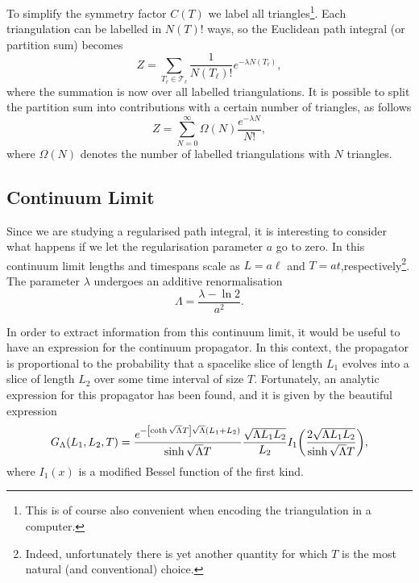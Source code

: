 To simplify the symmetry factor $C(T)$ we label all triangles\footnote{This is of course also convenient when encoding the triangulation in a computer.}. Each triangulation can be labelled in $N(T)!$ ways, so the Euclidean path integral (or partition sum) becomes
\begin{equation}
    Z
    =
    \sum_{T_\ell \in \mathcal{T}_\ell} \frac{1}{N(T_\ell)!} e^{- \lambda N(T_\ell)}
    ,
\end{equation}
where the summation is now over all labelled triangulations. It is possible to split the partition sum into contributions with a certain number of triangles, as follows
\begin{equation}\label{eq:part_sum}
    Z
    =
    \sum_{N = 0}^\infty \Omega(N) \frac{e^{- \lambda N}}{N!}
    ,
\end{equation}
where $\Omega(N)$ denotes the number of labelled triangulations with $N$ triangles.

\subsection{Continuum Limit}

Since we are studying a regularised path integral, it is interesting to consider what happens if we let the regularisation parameter $a$ go to zero. In this continuum limit lengths and timespans scale as $L = a \ell$ and $T = a t$,respectively\footnote{Indeed, unfortunately there is yet another quantity for which $T$ is the most natural (and conventional) choice.}. The parameter $\lambda$ undergoes an additive renormalisation
\begin{equation}
    \Lambda = \frac{\lambda - \ln 2}{a^2}
    .
\end{equation}

In order to extract information from this continuum limit, it would be useful to have an expression for the continuum propagator. In this context, the propagator is proportional to the probability that a spacelike slice of length $L_1$ evolves into a slice of length $L_2$ over some time interval of size $T$. Fortunately, an analytic expression for this propagator has been found, and it is given by the beautiful expression \cite{1998}
\begin{equation}
    G_\Lambda(L_1, L_2, T)
    =
    \frac{
        e^{-\qty[\coth \sqrt{\Lambda} T] \sqrt{\Lambda} (L_1 + L_2)}
    }{
        \sinh \sqrt{\Lambda} T
    }
    \frac{\sqrt{\Lambda L_1 L_2}}{L_2}
    I_1 \qty(\frac{2 \sqrt{\Lambda L_1 L_2}}{\sinh \sqrt{\Lambda} T})
    ,
\end{equation}
where $I_1(x)$ is a modified Bessel function of the first kind.

